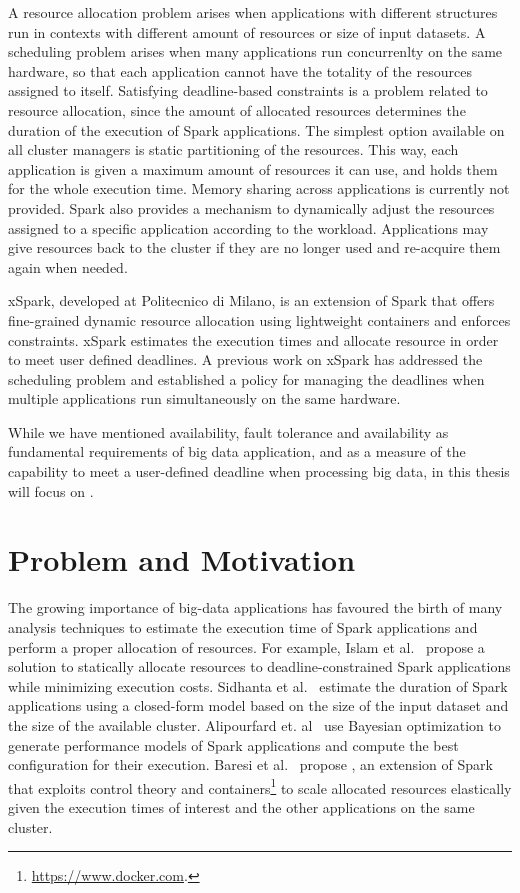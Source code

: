 A resource allocation problem arises when applications with different structures run in contexts with different amount of resources or size of input datasets. A scheduling problem arises when many applications run concurrenlty on the same hardware, so that each application cannot have the totality of the resources assigned to itself. Satisfying deadline-based \qos constraints is a problem related to resource allocation, since the amount of allocated resources determines the duration of the execution of Spark applications. The simplest option available on all cluster managers is static partitioning of the resources. This way, each application is given a maximum amount of resources it can use, and holds them for the whole execution time. Memory sharing across applications is currently not provided. Spark also provides a mechanism to dynamically adjust the resources assigned to a specific application according to the workload. Applications may give resources back to the cluster if they are no longer used and re-acquire them again when needed.

xSpark, developed at Politecnico di Milano, is an extension of Spark that offers fine-grained dynamic resource allocation using lightweight containers and enforces \qos constraints. xSpark estimates the execution times and allocate resource in order to meet user defined deadlines. A previous work on xSpark has addressed the scheduling problem and established a policy for managing the deadlines when multiple applications run simultaneously on the same hardware.

While we have mentioned availability, fault tolerance and availability as fundamental requirements of big data application, and \qos as a measure of the capability to meet a user-defined deadline when processing big data, in this thesis will focus on \qos.

\section{Problem and Motivation}\label{sec:problem_motivation}
The growing importance of big-data applications has favoured the birth of many analysis techniques to estimate the execution time of Spark applications and perform a proper allocation of resources. For example, Islam et al.~\cite{dSpark} propose a solution to statically allocate resources to deadline-constrained Spark applications while minimizing execution costs. Sidhanta et al.~\cite{Sidhanta2016} estimate the duration of Spark applications using a closed-form model based on the size of the input dataset and the size of the available cluster. Alipourfard et. al~\cite{Alipourfard} use Bayesian optimization to generate performance models of Spark applications and compute the best configuration for their execution.  Baresi et al.~\cite{xsparkreport, Quattrocchi2018} propose \cSpark, an extension of Spark that exploits control theory and containers\footnote{\url{https://www.docker.com}.} to scale allocated resources elastically given the execution times of interest and the other applications  on the same cluster.

